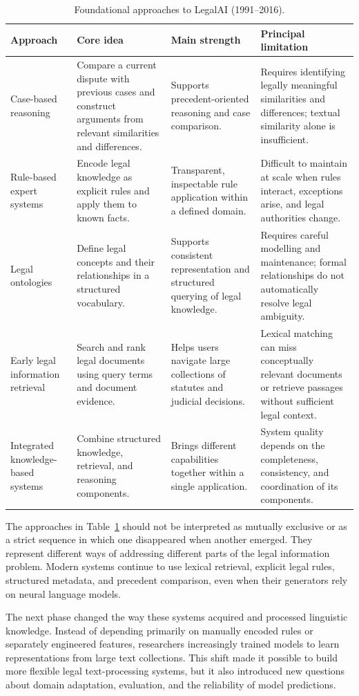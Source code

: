 \begin{table}[tp]
\centering
\caption{Foundational approaches to LegalAI (1991--2016).}
\label{tab:foundational}
\footnotesize
\setlength{\tabcolsep}{5pt}
\renewcommand{\arraystretch}{1.3}
\begin{tabularx}{\textwidth}{>{\raggedright\arraybackslash}p{2.6cm} >{\raggedright\arraybackslash}X >{\raggedright\arraybackslash}X >{\raggedright\arraybackslash}X}
\toprule
\textbf{Approach} & \textbf{Core idea} & \textbf{Main strength} & \textbf{Principal limitation} \\
\midrule
Case-based reasoning & Compare a current dispute with previous cases and construct arguments from relevant similarities and differences. & Supports precedent-oriented reasoning and case comparison. & Requires identifying legally meaningful similarities and differences; textual similarity alone is insufficient. \\
Rule-based expert systems & Encode legal knowledge as explicit rules and apply them to known facts. & Transparent, inspectable rule application within a defined domain. & Difficult to maintain at scale when rules interact, exceptions arise, and legal authorities change. \\
Legal ontologies & Define legal concepts and their relationships in a structured vocabulary. & Supports consistent representation and structured querying of legal knowledge. & Requires careful modelling and maintenance; formal relationships do not automatically resolve legal ambiguity. \\
Early legal information retrieval & Search and rank legal documents using query terms and document evidence. & Helps users navigate large collections of statutes and judicial decisions. & Lexical matching can miss conceptually relevant documents or retrieve passages without sufficient legal context. \\
Integrated knowledge-based systems & Combine structured knowledge, retrieval, and reasoning components. & Brings different capabilities together within a single application. & System quality depends on the completeness, consistency, and coordination of its components. \\
\bottomrule
\end{tabularx}
\end{table}

The approaches in Table~\ref{tab:foundational} should not be interpreted as mutually exclusive or as
a strict sequence in which one disappeared when another emerged. They represent different ways of
addressing different parts of the legal information problem. Modern systems continue to use lexical
retrieval, explicit legal rules, structured metadata, and precedent comparison, even when their
generators rely on neural language models.

The next phase changed the way these systems acquired and processed linguistic knowledge. Instead of
depending primarily on manually encoded rules or separately engineered features, researchers
increasingly trained models to learn representations from large text collections. This shift made it
possible to build more flexible legal text-processing systems, but it also introduced new questions
about domain adaptation, evaluation, and the reliability of model predictions.
